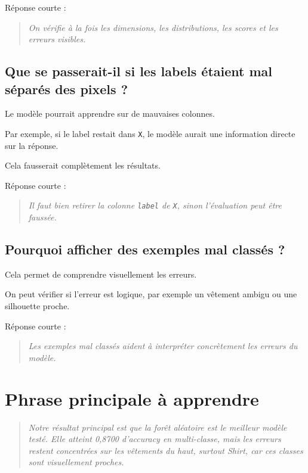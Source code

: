 \documentclass[11pt,a4paper]{article}
\begin{document}
Réponse courte :

\begin{quote}
\itshape On vérifie à la fois les dimensions, les distributions, les scores et les erreurs visibles.
\end{quote}

\subsection{Que se passerait-il si les labels étaient mal séparés des pixels ?}

Le modèle pourrait apprendre sur de mauvaises colonnes.

Par exemple, si le label restait dans \texttt{X}, le modèle aurait une information directe sur la réponse.

Cela fausserait complètement les résultats.

Réponse courte :

\begin{quote}
\itshape Il faut bien retirer la colonne \texttt{label} de \texttt{X}, sinon l'évaluation peut être faussée.
\end{quote}

\subsection{Pourquoi afficher des exemples mal classés ?}

Cela permet de comprendre visuellement les erreurs.

On peut vérifier si l'erreur est logique, par exemple un vêtement ambigu ou une silhouette proche.

Réponse courte :

\begin{quote}
\itshape Les exemples mal classés aident à interpréter concrètement les erreurs du modèle.
\end{quote}

\section{Phrase principale à apprendre}

\begin{quote}
\itshape Notre résultat principal est que la forêt aléatoire est le meilleur modèle testé. Elle atteint 0,8700 d'accuracy en multi-classe, mais les erreurs restent concentrées sur les vêtements du haut, surtout Shirt, car ces classes sont visuellement proches.
\end{quote}
\end{document}

